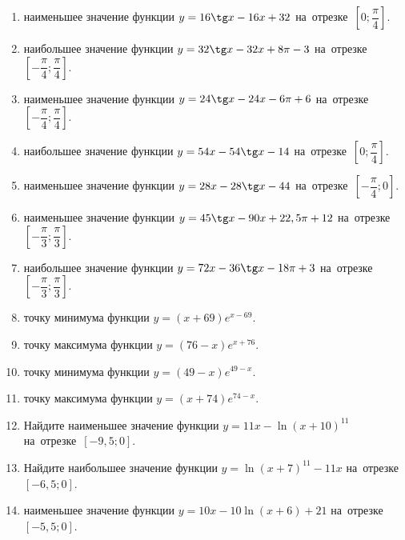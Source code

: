 \documentclass[a4paper,10pt]{article}
\begin{document}
\begin{enumerate}
\item {} наименьшее значение функции $y = 16\tg x-16x+32$ на~отрезке~$\left[0;\dfrac{\pi }{4}\right]$.

\item {} наибольшее значение функции $y=32\tg x-32x+8\pi -3$ на~отрезке~$\left[-\dfrac{\pi }{4};\dfrac{\pi }{4}\right]$.

\item {} наименьшее значение функции $y=24\tg x-24x-6\pi +6$ на~отрезке~$\left[-\dfrac{\pi }{4};\dfrac{\pi }{4}\right]$.

\item {} наибольшее значение функции $y = 54x-54\tg x -14$ на~отрезке~$\left[0;\dfrac{\pi }{4}\right]$.

\item {} наименьшее значение функции $y = 28x-28\tg x -44$ на~отрезке~$\left[-\dfrac{\pi }{4};0\right]$.

\item {} наименьшее значение функции $y = 45\tg x-90x+22,5 \pi +12$ на~отрезке~$\left[-\dfrac{\pi }{3};\dfrac{\pi }{3}\right]$.

\item {} наибольшее значение функции $y = 72x-36\tg x-18\pi +3$ на~отрезке~$\left[-\dfrac{\pi }{3};\dfrac{\pi }{3}\right]$.

\item {} точку минимума функции $y = \left(x+69\right)e^{x-69}$.

\item {} точку максимума функции $y = \left(76-x\right)e^{x+76}$.

\item {} точку минимума функции $y = \left(49-x\right)e^{49-x}$.

\item {} точку максимума функции $y = \left(x+74\right)e^{74-x}$.

\item Найдите наименьшее значение функции $y = 11x-\ln \left(x+10\right)^{11}$ на~отрезке~$\left[-9,5;0\right]$.

\item Найдите наибольшее значение функции $y = \ln \left(x+7\right)^{11}-11x$ на~отрезке~$\left[-6,5;0\right]$.

\item {} наименьшее значение функции $y = 10x-10\ln \left(x+6\right) +21$ на~отрезке~$\left[-5,5;0\right]$.


\end{enumerate}
\end{document}
